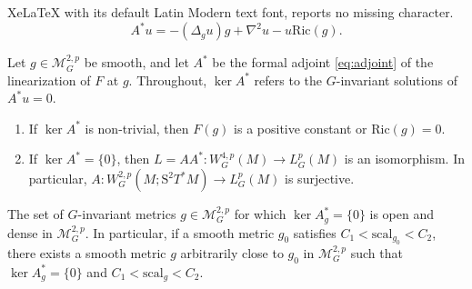 \documentclass[10pt,a4paper]{amsart}
\newcommand{\ga}{\mathit{g}} %
\begin{document}
XeLaTeX with its default Latin Modern text font, reports no missing character.
\begin{equation}\label{eq:adjoint}
    A^*u = -(\Delta_{\ga} u)\ga + \nabla^2 u - u \mathrm{Ric}(\ga).
\end{equation}

\begin{lemma}\label{lem:marsden}
Let $\ga \in \mathcal{M}_G^{2,p}$ be smooth, and let $A^*$ be the formal adjoint \eqref{eq:adjoint} of the linearization of $F$ at $\ga$. Throughout, $\ker A^*$ refers to the $G$-invariant solutions of $A^* u = 0$.
    \begin{enumerate}[label=\textup{(\alph*)}, font=\upshape]
        \item If $\ker A^*$ is non-trivial, then $F(\ga)$ is a positive constant or $\mathrm{Ric}(\ga) = 0$. 
        \item If $\ker A^* = \{0\}$, then $L = AA^* : W_G^{4,p}(M) \to L_G^p(M)$ is an isomorphism. In particular, $A: W_G^{2,p}(M; \mathrm{S}^2T^{\ast}M) \to L_G^p(M)$ is surjective.
    \end{enumerate}
\end{lemma}

\begin{lemma}\label{lem:dense_kernel}
The set of $G$-invariant metrics $\ga \in \mathcal{M}_G^{2,p}$ for which $\ker A_{\ga}^* = \{0\}$ is open and dense in $\mathcal{M}_G^{2,p}$. In particular, if a smooth metric $\ga_0$ satisfies $C_1 < \mathrm{scal}_{\ga_0} < C_2$, there exists a smooth metric $\ga$ arbitrarily close to $\ga_0$ in $\mathcal{M}_G^{2,p}$ such that $\ker A_{\ga}^* = \{0\}$ and $C_1 < \mathrm{scal}_{\ga} < C_2$.
\end{lemma}
\end{document}
